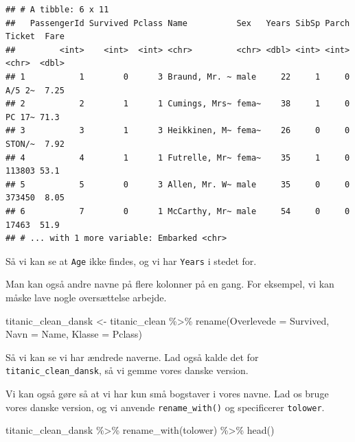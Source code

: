 \documentclass[
]{book}
\newenvironment{Shaded}{\begin{snugshade}}{\end{snugshade}}
\newcommand{\AttributeTok}[1]{\textcolor[rgb]{0.77,0.63,0.00}{#1}}
\newcommand{\FunctionTok}[1]{\textcolor[rgb]{0.00,0.00,0.00}{#1}}
\newcommand{\NormalTok}[1]{#1}
\newcommand{\OtherTok}[1]{\textcolor[rgb]{0.56,0.35,0.01}{#1}}
\newcommand{\SpecialCharTok}[1]{\textcolor[rgb]{0.00,0.00,0.00}{#1}}
\begin{document}
\begin{verbatim}
## # A tibble: 6 x 11
##   PassengerId Survived Pclass Name          Sex   Years SibSp Parch Ticket  Fare
##         <int>    <int>  <int> <chr>         <chr> <dbl> <int> <int> <chr>  <dbl>
## 1           1        0      3 Braund, Mr. ~ male     22     1     0 A/5 2~  7.25
## 2           2        1      1 Cumings, Mrs~ fema~    38     1     0 PC 17~ 71.3 
## 3           3        1      3 Heikkinen, M~ fema~    26     0     0 STON/~  7.92
## 4           4        1      1 Futrelle, Mr~ fema~    35     1     0 113803 53.1 
## 5           5        0      3 Allen, Mr. W~ male     35     0     0 373450  8.05
## 6           7        0      1 McCarthy, Mr~ male     54     0     0 17463  51.9 
## # ... with 1 more variable: Embarked <chr>
\end{verbatim}

Så vi kan se at \texttt{Age} ikke findes, og vi har \texttt{Years} i stedet for.

Man kan også andre navne på flere kolonner på en gang. For eksempel, vi kan måske lave nogle oversættelse arbejde.

\begin{Shaded}
\begin{Highlighting}[]
\NormalTok{titanic\_clean\_dansk }\OtherTok{\textless{}{-}}\NormalTok{ titanic\_clean }\SpecialCharTok{\%\textgreater{}\%}
  \FunctionTok{rename}\NormalTok{(}\AttributeTok{Overlevede =}\NormalTok{ Survived,}
         \AttributeTok{Navn =}\NormalTok{ Name,}
         \AttributeTok{Klasse =}\NormalTok{ Pclass)}
\end{Highlighting}
\end{Shaded}

Så vi kan se vi har ændrede naverne. Lad også kalde det for \texttt{titanic\_clean\_dansk}, så vi gemme vores danske version.

Vi kan også gøre så at vi har kun små bogstaver i vores navne. Lad os bruge vores danske version, og vi anvende \texttt{rename\_with()} og specificerer \texttt{tolower}.

\begin{Shaded}
\begin{Highlighting}[]
\NormalTok{titanic\_clean\_dansk }\SpecialCharTok{\%\textgreater{}\%}
  \FunctionTok{rename\_with}\NormalTok{(tolower)  }\SpecialCharTok{\%\textgreater{}\%} 
  \FunctionTok{head}\NormalTok{() }
\end{Highlighting}
\end{Shaded}
\end{document}
